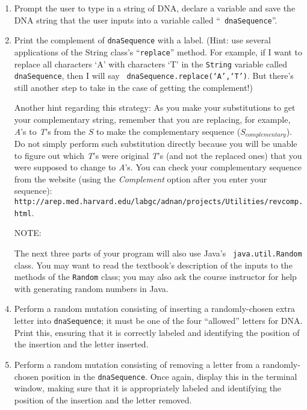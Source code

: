 \documentclass[11pt]{article}
\newcommand{\url}[1]{\lstinline{#1}}
\begin{document}
\begin{enumerate}

\item Prompt the user to type in a string of DNA, declare a variable and save
  the DNA string that the user inputs into a variable called ``{\tt
  dnaSequence}''.

\item Print the complement of {\tt dnaSequence} with a label. (Hint: use several
  applications of the String class's ``{\tt replace}'' method. For example, if I
  want to replace all characters `A' with characters `T' in the {\tt String}
  variable called {\tt dnaSequence}, then I will say {\tt
  dnaSequence.replace(`A',`T')}. But there's still another step to take in the
  case of getting the complement!)

Another hint regarding this strategy: As you make your substitutions to get your
complementary string, remember that you are replacing, for example, \emph{A}'s
to \emph{T}'s from the $S$ to make the complementary sequence
($S_{complementary}$). Do not simply perform such substitution directly because
you will be unable to figure out which \emph{T}'s were original \emph{T}'s (and
not the replaced ones) that you were supposed to change to \emph{A}'s. You can
check your complementary sequence from the website  (using the \emph{Complement}
option after you enter your sequence):
\url{http://arep.med.harvard.edu/labgc/adnan/projects/Utilities/revcomp.html}.

\item[NOTE:]

  The next three parts of your program will also use Java's {\tt
  java.util.Random} class. You may want to read the textbook's description of
  the inputs to the methods of the {\tt Random} class; you may also ask the
  course instructor for help with generating random numbers in Java.

\item \begin{sloppypar} Perform a random mutation consisting of inserting a
    randomly-chosen extra letter into {\tt dnaSequence}; it must be one of the
    four ``allowed'' letters for DNA. Print this, ensuring that it is correctly
    labeled and identifying the position of the insertion and the letter
  inserted. \end{sloppypar}

\item Perform a random mutation consisting of removing a letter from a
  randomly-chosen position in the {\tt dnaSequence}. Once again, display this in
  the terminal window, making sure that it is appropriately labeled and
  identifying the position of the insertion and the letter removed.


\end{enumerate}
\end{document}
